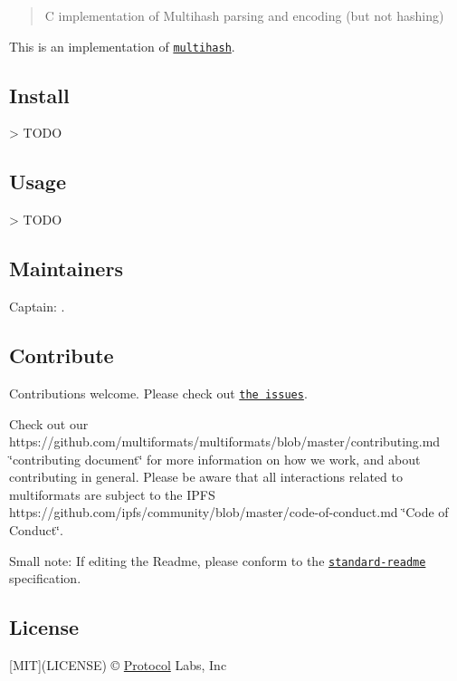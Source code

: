 \href{http://ipn.io}{\tt } \href{http://github.com/multiformats/multiformats}{\tt } \href{http://webchat.freenode.net/?channels=%23ipfs}{\tt }

\begin{quote}
C implementation of Multihash parsing and encoding (but not hashing) \end{quote}


This is an implementation of \href{https://github.com/multiformats/multihash}{\tt multihash}.

\subsection*{Install}


\begin{DoxyCode}
> TODO
\end{DoxyCode}


\subsection*{Usage}


\begin{DoxyCode}
> TODO
\end{DoxyCode}


\subsection*{Maintainers}

Captain\+: \href{https://github.com/Kubuxu}{\tt }.

\subsection*{Contribute}

Contributions welcome. Please check out \href{https://github.com/multiformats/c-multihash/issues}{\tt the issues}.

Check out our https\+://github.com/multiformats/multiformats/blob/master/contributing.\+md \char`\"{}contributing document\char`\"{} for more information on how we work, and about contributing in general. Please be aware that all interactions related to multiformats are subject to the I\+P\+FS https\+://github.com/ipfs/community/blob/master/code-\/of-\/conduct.\+md \char`\"{}\+Code of Conduct\char`\"{}.

Small note\+: If editing the Readme, please conform to the \href{https://github.com/RichardLitt/standard-readme}{\tt standard-\/readme} specification.

\subsection*{License}

\mbox{[}M\+IT\mbox{]}(L\+I\+C\+E\+N\+SE) © \mbox{\hyperlink{struct_protocol}{Protocol}} Labs, Inc 